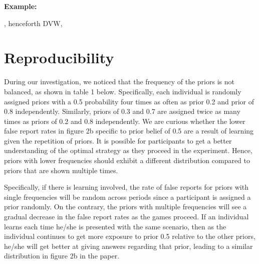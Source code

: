 \documentclass[12pt,a4paper]{article}
\begin{document}
	
	\textbf{Example:} 
	
	\cite{analyst_2022}, henceforth DVW, 
	
	
	\section{Reproducibility}
	
	During our investigation, we noticed that the frequency of the priors is not balanced, as shown in table 1 below. Specifically, each individual is randomly assigned priors with a 0.5 probability four times as often as prior 0.2 and prior of 0.8 independently. Similarly, priors of 0.3 and 0.7 are assigned twice as many times as priors of 0.2 and 0.8 independently. We are curious whether the lower false report rates in figure 2b specific to prior belief of 0.5 are a result of learning given the repetition of priors. It is possible for participants to get a better understanding of the optimal strategy as they proceed in the experiment. Hence, priors with lower frequencies should exhibit a different distribution compared to priors that are shown multiple times.
	
	\hspace *{0mm} Specifically, if there is learning involved, the rate of false reports for priors with single frequencies will be random across periods since a participant is assigned a prior randomly. On the contrary, the priors with multiple frequencies will see a gradual decrease in the false report rates as the games proceed. If an individual learns each time he/she is presented with the same scenario, then as the individual continues to get more exposure to prior 0.5 relative to the other priors, he/she will get better at giving answers regarding that prior, leading to a similar distribution in figure 2b in the paper.
	
\end{document}
